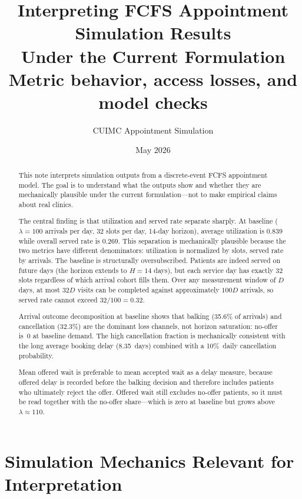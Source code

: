 \documentclass[11pt]{article}
\title{Interpreting FCFS Appointment Simulation Results\\
Under the Current Formulation\\[0.4em]
\large Metric behavior, access losses, and model checks}
\author{CUIMC Appointment Simulation}
\date{May 2026}
\begin{document}
\maketitle

\begin{abstract}
\noindent
This note interprets simulation outputs from a discrete-event FCFS appointment
model. The goal is to understand what the outputs show and whether they are
mechanically plausible under the current formulation---not to make empirical
claims about real clinics.

The central finding is that utilization and served rate separate sharply.
At baseline ($\lambda = 100$ arrivals per day, 32 slots per day, 14-day
horizon), average utilization is 0.839 while overall served rate is 0.269.
This separation is mechanically plausible because the two metrics have
different denominators: utilization is normalized by slots, served rate by
arrivals. The baseline is structurally oversubscribed. Patients are indeed served
on future days (the horizon extends to $H = 14$ days), but each service day
has exactly 32 slots regardless of which arrival cohort fills them. Over
any measurement window of $D$ days, at most $32D$ visits can be completed
against approximately $100D$ arrivals, so served rate cannot exceed
$32/100 = 0.32$.

Arrival outcome decomposition at baseline shows that balking (35.6\% of
arrivals) and cancellation (32.3\%) are the dominant loss channels, not
horizon saturation: no-offer is~0 at baseline demand. The high cancellation
fraction is mechanically consistent with the long average booking delay
(8.35~days) combined with a 10\%~daily cancellation probability.

Mean offered wait is preferable to mean accepted wait as a delay measure,
because offered delay is recorded before the balking decision and therefore
includes patients who ultimately reject the offer. Offered wait still excludes
no-offer patients, so it must be read together with the no-offer share---which
is zero at baseline but grows above $\lambda \approx 110$.
\end{abstract}

\tableofcontents
\newpage

\section{Simulation Mechanics Relevant for Interpretation}
\label{sec:mechanics}
\end{document}
